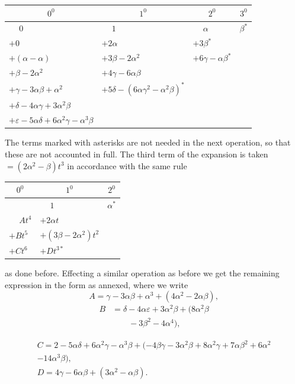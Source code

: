 \documentclass[11pt]{article}
\begin{document}
\begin{center}
\begin{tabular}{|l|l|l|l|}
\hline
\multicolumn{1}{|c|}{$0^0$} & \multicolumn{1}{c|}{$1^0$} & \multicolumn{1}{c|}{$2^0$} & \multicolumn{1}{c|}{$3^0$}\\
\hline
$\phantom{+}0$ & $\phantom{+}1$ & $\phantom{+}\alpha$ & $\beta^*$\\
$+0$ & $+2\alpha$ & $+3\beta^*$ & \\
$+(\alpha-\alpha)$ & $+3\beta-2\alpha^2$ & $+6\gamma-\alpha\beta^*$ & \\
$+\beta-2\alpha^2$ & $+4\gamma-6\alpha\beta$ & & \\
$+\gamma-3\alpha\beta+\alpha^2$\, & $+5\delta-(6\alpha\gamma^2-\alpha^2\beta)^*$ & & \\
$+\delta-4\alpha\gamma+3\alpha^2\beta$ & & & \\
$+\varepsilon-5\alpha\delta+6\alpha^2\gamma-\alpha^3\beta$ & & & \\
\hline
\end{tabular}
\end{center}

The terms marked with asterisks are not needed in the next operation, so that these are not accounted in full. The third term of the expansion is taken $=(2\alpha^2-\beta)t^3$ in accordance with the same rule

\noindent
\begin{minipage}[t]{0.47\linewidth}\vspace{0pt}
\begin{tabular}{|l|l|l|}
\hline
\multicolumn{1}{|c|}{$0^0$} & \multicolumn{1}{c|}{$1^0$} & \multicolumn{1}{c|}{$2^0$}\\
\hline
 & $\phantom{+}1$ & $\alpha^*$\\
$\phantom{+}At^4$ & $+2\alpha t$ & \\
$+Bt^5$ & $+(3\beta-2\alpha^2)t^2$ & \\
$+Ct^6$ & $+Dt^{3*}$ & \\
\hline
\end{tabular}
\end{minipage}\hfill
\begin{minipage}[t]{0.5\linewidth}\vspace{0pt}
as done before. Effecting a similar operation as before we get the remaining expression in the form as annexed, where we write
\[
A=\gamma-3\alpha\beta+\alpha^3+(4\alpha^2-2\alpha\beta),
\]
\[
\begin{aligned}
B&=\delta-4\alpha\varepsilon+3\alpha^2\beta+(8\alpha^2\beta\\
&\qquad-3\beta^2-4\alpha^4),
\end{aligned}
\]
\end{minipage}
\[
\begin{gathered}
C=2-5\alpha\delta+6\alpha^2\gamma-\alpha^3\beta+(-4\beta\gamma-3\alpha^2\beta+8\alpha^2\gamma+7\alpha\beta^2+6\alpha^2\\
-14\alpha^3\beta),\\
D=4\gamma-6\alpha\beta+(3\alpha^2-\alpha\beta).
\end{gathered}
\]
\end{document}
